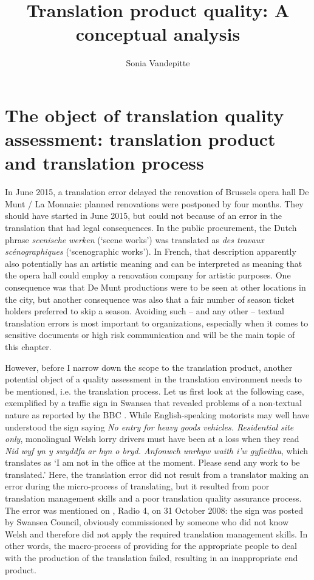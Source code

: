 \documentclass[output=paper]{langsci/langscibook}
\author{Sonia Vandepitte\affiliation{Ghent University}}
\title{Translation product quality: A conceptual analysis}
\begin{document}
\section{The object of translation quality assessment: translation product and translation process}\label{sec:vandepitte:1}

In June 2015, a translation error delayed the renovation of Brussels opera hall De Munt / La Monnaie: planned renovations were postponed by four months. They should have started in June 2015, but could not because of an error in the translation that had legal consequences. In the public procurement, the Dutch phrase \textit{scenische werken} (`scene works') was translated as \textit{des travaux scénographiques} (`scenographic works'). In French, that description apparently also potentially has an artistic meaning and can be interpreted as meaning that the opera hall could employ a renovation company for artistic purposes. One consequence was that De Munt productions were to be seen at other locations in the city, but another consequence was also that a fair number of season ticket holders preferred to skip a season. Avoiding such – and any other – textual translation errors is most important to organizations, especially when it comes to sensitive documents or high risk communication and will be the main topic of this chapter. 


However, before I narrow down the scope to the translation product, another potential object of a quality assessment in the translation environment needs to be mentioned, i.e. the translation process. Let us first look at the following case, exemplified by a traffic sign in Swansea that revealed problems of a non-textual nature as reported by the BBC \citep{BBCNews2008}. While English-speaking motorists may well have understood the sign saying \textit{No entry for heavy goods vehicles. Residential site only}, monolingual Welsh lorry drivers must have been at a loss when they read \textit{Nid wyf yn y swyddfa ar hyn o bryd. Anfonwch unrhyw waith i'w gyfieithu}, which translates as `I am not in the office at the moment. Please send any work to be translated.' Here, the translation error did not result from a translator making an error during the micro-process of translating, but it resulted from poor translation management skills and a poor translation quality assurance process. The error was mentioned on \citeauthor{BBCNews2008}, Radio 4, on 31 October 2008: the sign was posted by Swansea Council, obviously commissioned by someone who did not know Welsh and therefore did not apply the required translation management skills. In other words, the macro-process of providing for the appropriate people to deal with the production of the translation failed, resulting in an inappropriate end product.
\end{document}
